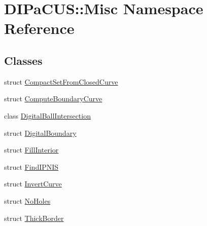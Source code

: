 \hypertarget{namespaceDIPaCUS_1_1Misc}{}\section{D\+I\+Pa\+C\+US\+:\+:Misc Namespace Reference}
\label{namespaceDIPaCUS_1_1Misc}
\subsection*{Classes}
\begin{DoxyCompactItemize}
\item 
struct \mbox{\hyperlink{structDIPaCUS_1_1Misc_1_1CompactSetFromClosedCurve}{Compact\+Set\+From\+Closed\+Curve}}
\item 
struct \mbox{\hyperlink{structDIPaCUS_1_1Misc_1_1ComputeBoundaryCurve}{Compute\+Boundary\+Curve}}
\item 
class \mbox{\hyperlink{classDIPaCUS_1_1Misc_1_1DigitalBallIntersection}{Digital\+Ball\+Intersection}}
\item 
struct \mbox{\hyperlink{structDIPaCUS_1_1Misc_1_1DigitalBoundary}{Digital\+Boundary}}
\item 
struct \mbox{\hyperlink{structDIPaCUS_1_1Misc_1_1FillInterior}{Fill\+Interior}}
\item 
struct \mbox{\hyperlink{structDIPaCUS_1_1Misc_1_1FindIPNIS}{Find\+I\+P\+N\+IS}}
\item 
struct \mbox{\hyperlink{structDIPaCUS_1_1Misc_1_1InvertCurve}{Invert\+Curve}}
\item 
struct \mbox{\hyperlink{structDIPaCUS_1_1Misc_1_1NoHoles}{No\+Holes}}
\item 
struct \mbox{\hyperlink{structDIPaCUS_1_1Misc_1_1ThickBorder}{Thick\+Border}}
\end{DoxyCompactItemize}
